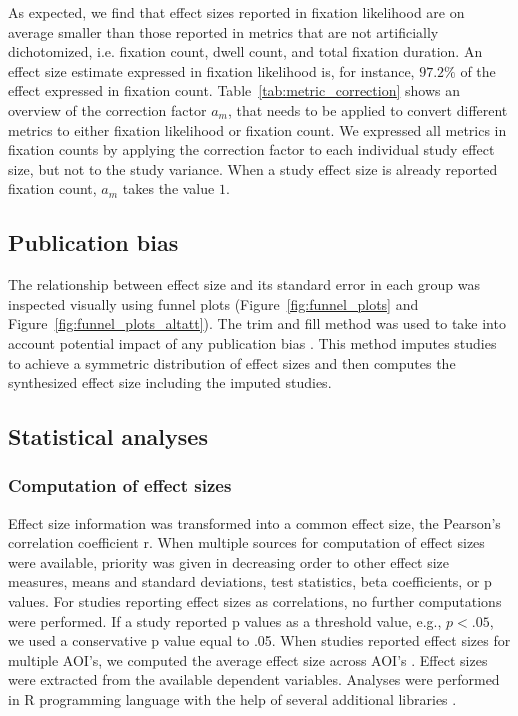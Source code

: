 As expected, we find that effect sizes reported in fixation likelihood are on average smaller than those reported in metrics that are not artificially dichotomized, i.e. fixation count, dwell count, and total fixation duration. An effect size estimate expressed in fixation likelihood is, for instance, $97.2\%$ of the effect expressed in fixation count. Table~\ref{tab:metric_correction} shows an overview of the correction factor $a_m$, that needs to be applied to convert different metrics to either fixation likelihood or fixation count. We expressed all metrics in fixation counts by applying the correction factor to each individual study effect size, but not to the study variance. When a study effect size is already reported fixation count, $a_m$ takes the value $1$.  


\subsection{Publication bias}

The relationship between effect size and its standard error in each group was inspected visually using funnel plots (Figure~\ref{fig:funnel_plots} and Figure~\ref{fig:funnel_plots_altatt}). The trim and fill method was used to take into account potential impact of any publication bias \citep{duval2000trim}. This method imputes studies to achieve a symmetric distribution of effect sizes and then computes the synthesized effect size including the imputed studies.


\subsection{Statistical analyses}

\subsubsection{Computation of effect sizes}

Effect size information was transformed into a common effect size, the Pearson’s correlation coefficient r. When multiple sources for computation of effect sizes were available, priority was given in decreasing order to other effect size measures, means and standard deviations, test statistics, beta coefficients, or p values. For studies reporting effect sizes as correlations, no further computations were performed. If a study reported p values as a threshold value, e.g., $p < .05$, we used a conservative p value equal to .05. When studies reported effect sizes for multiple AOI's, we computed the average effect size across AOI's \citep[for a similar approach, see][]{chita2016attention}. Effect sizes were extracted from the available dependent variables. Analyses were performed in R programming language with the help of several additional libraries \citep{R2020,del2012a,datatable,ggplot2,metafor}.


